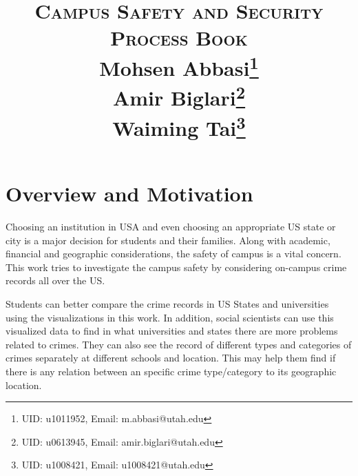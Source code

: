 \documentclass[12pt]{article}
\title{	
\normalfont \Large 
\textsc{Campus Safety and Security\\Process Book} \\ [10pt] 
Mohsen Abbasi\footnote{UID: u1011952, Email: m.abbasi@utah.edu} \\ 
Amir Biglari\footnote{UID: u0613945, Email: amir.biglari@utah.edu}\\
Waiming Tai\footnote{UID: u1008421, Email: u1008421@utah.edu}
}
\date{}
\begin{document}
\maketitle
\noindent

\section{Overview and Motivation}
Choosing an institution in USA and even choosing an appropriate US state or city is a major decision for students and their families. Along with academic, financial and 
geographic considerations, the safety of campus is a vital concern. This work tries to investigate the campus safety by considering on-campus crime records all over the US. 

Students can better compare the crime records in US States and universities using the visualizations in this work. In addition, social scientists can use this visualized data to find in what universities and states there are more problems related to crimes. They can also see the record of different types and categories of crimes separately at different schools and location. This may help them find if there is any relation between an specific crime type/category to its geographic location.
\end{document}
